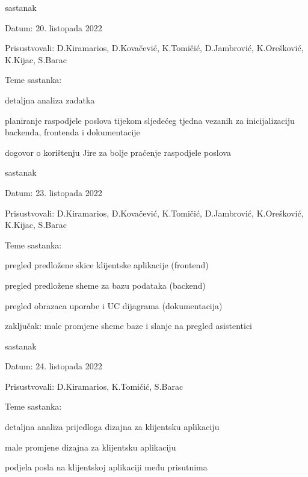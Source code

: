 \begin{packed_enum}
			\item  sastanak
			\item[] \begin{packed_item}
				\item Datum: 20. listopada 2022
				\item Prisustvovali: D.Kiramarios, D.Kovačević, K.Tomičić, D.Jambrović, K.Orešković, K.Kijac, S.Barac
				\item Teme sastanka:
				\begin{packed_item}
					\item  detaljna analiza zadatka
					\item  planiranje raspodjele poslova tijekom sljedećeg tjedna vezanih za inicijalizaciju backenda, frontenda i dokumentacije
					\item  dogovor o korištenju Jire za bolje praćenje raspodjele poslova
				\end{packed_item}
			\end{packed_item}

			\eject

			\item  sastanak
			\item[] \begin{packed_item}
				\item Datum: 23. listopada 2022
				\item Prisustvovali: D.Kiramarios, D.Kovačević, K.Tomičić, D.Jambrović, K.Orešković, K.Kijac, S.Barac
				\item Teme sastanka:
				\begin{packed_item}
					\item  pregled predložene skice klijentske aplikacije (frontend)
					\item  pregled predložene sheme za bazu podataka (backend)
					\item  pregled obrazaca uporabe i UC dijagrama (dokumentacija)
					\item  zaključak: male promjene sheme baze i slanje na pregled asistentici
				\end{packed_item}
			\end{packed_item}

			\item  sastanak
			\item[] \begin{packed_item}
				\item Datum: 24. listopada 2022
				\item Prisustvovali: D.Kiramarios, K.Tomičić, S.Barac
				\item Teme sastanka:
				\begin{packed_item}
					\item  detaljna analiza prijedloga dizajna za klijentsku aplikaciju
					\item  male promjene dizajna za klijentsku aplikaciju
					\item  podjela posla na klijentskoj aplikaciji među prisutnima
				\end{packed_item}
			\end{packed_item}
			
		\end{packed_enum}
		
